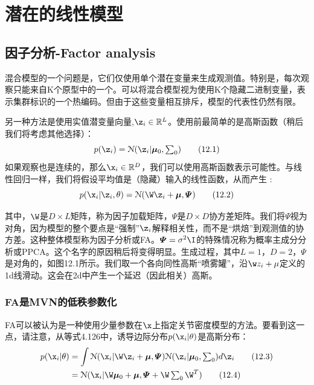 \documentclass[a4paper]{article}
\begin{document}
\setcounter{section}{0}

\clearpage
\section{潜在的线性模型}
\subsection{因子分析-Factor analysis}

混合模型的一个问题是，它们仅使用单个潜在变量来生成观测值。特别是，每次观察只能来自K个原型中的一个。可以将混合模型视为使用K个隐藏二进制变量，表示集群标识的一个热编码。但由于这些变量相互排斥，模型的代表性仍然有限。 

另一种方法是使用实值潜变量向量,$\z_i\in\mathbb{R}^L$。使用前最简单的是高斯函数（稍后我们将考虑其他选择）：
\begin{equation}
	p(\z_i)=\mathcal{N}(\z_i\vert\boldsymbol{\mu}_0,\textstyle\sum\nolimits_{0})\tag{12.1}
\end{equation}
如果观察也是连续的，那么$\x_i\in\mathbb{R}^D$，我们可以使用高斯函数表示可能性。与线性回归一样，我们将假设平均值是（隐藏）输入的线性函数，从而产生 :
\begin{equation}
	p(\x_i\vert\z_i,\theta)=\mathcal{N}(\W\z_i+\boldsymbol{\mu},\boldsymbol{\varPsi})\tag{12.2}
\end{equation}

其中，$\W$是$D\times L$矩阵，称为因子加载矩阵，$\boldsymbol{\varPsi}$是$D\times D$协方差矩阵。我们将$\boldsymbol{\varPsi}$视为对角，因为模型的整个要点是“强制”$\z_i$解释相关性，而不是“烘焙”到观测值的协方差。这种整体模型称为因子分析或FA。$\boldsymbol{\varPsi}=\sigma^2\I$的特殊情况称为概率主成分分析或PPCA。这个名字的原因稍后将变得明显。生成过程，其中$L=1，D=2$，$\boldsymbol{\varPsi}$是对角的，如图12.1所示。我们取一个各向同性高斯“喷雾罐”，沿$\w z_i+\mu$定义的1d线滑动。这会在2d中产生一个延迟（因此相关）高斯。 

\subsubsection{FA是MVN的低秩参数化}

FA可以被认为是一种使用少量参数在$\x$上指定关节密度模型的方法。要看到这一点，请注意，从等式4.126中，诱导边际分布$p(\x_i\vert\theta)$是高斯分布： 
\begin{align}
	p(\x_i\vert\theta)&=\int\mathcal{N}(\x_i\vert\W\z_i+\boldsymbol{\mu},\boldsymbol{\varPsi})\mathcal{N}(\z_i\vert\boldsymbol{\mu}_0,\textstyle\sum\nolimits_{0})d\z_i\tag{12.3}\\
	&=\mathcal{N}(\x_i\vert\W\boldsymbol{\mu}_0+\boldsymbol{\mu},\boldsymbol{\varPsi}+\W\textstyle\sum\nolimits_{0}\W^T)\tag{12.4}
\end{align}
\end{document}
